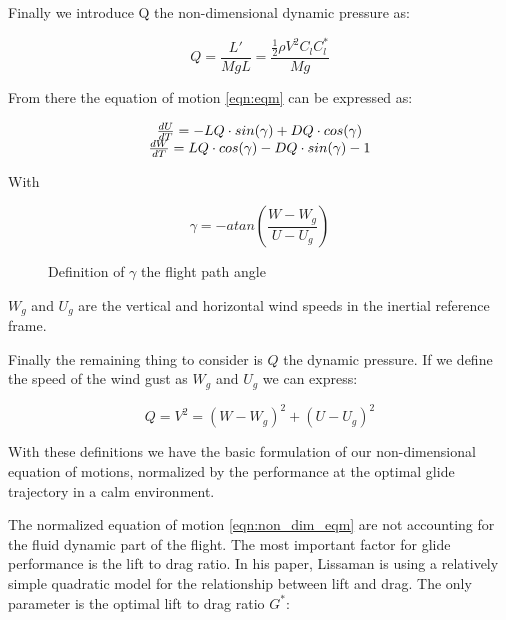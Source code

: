 \par Finally we introduce Q the non-dimensional dynamic pressure as:

\begin{equation}
Q = \frac{L'}{MgL} = \frac{\frac{1}{2} \rho V^2 C_l C_l^* }{Mg}
\label{eqn:dynamic_pressure}
\end{equation}

\par From there the equation of motion \ref{eqn:eqm} can be expressed as:

\begin{equation}
\begin{array}[c]{c}
  \frac{dU}{dT}= -LQ \cdot sin(\gamma) + DQ \cdot cos(\gamma) \\ 
  \frac{dW}{dT}= LQ \cdot cos(\gamma) - DQ \cdot sin(\gamma) - 1
\end{array}
\label{eqn:non_dim_eqm}
\end{equation}

With 

\begin{equation}
\gamma = -atan(\frac{W-W_g}{U-U_g})
\label{eqn:gamma_def}
\end{equation}

\begin{figure}[h]
  \centering
  \caption{Definition of $\gamma$ the flight path angle}
  \label{fig:gamma}
\end{figure}


$W_g$ and $U_g$ are the vertical and horizontal wind speeds in the inertial reference frame.

\par Finally the remaining thing to consider is $Q$ the dynamic pressure. If we define the speed of the wind gust as $W_g$ and $U_g$ we can express:

\begin{equation}
Q = V^2 = (W-W_g)^2 + (U-U_g)^2
\label{eqn:q_def}
\end{equation}

\par With these definitions we have the basic formulation of our non-dimensional equation of motions, normalized by the performance at the optimal glide trajectory in a calm environment.

The normalized equation of motion \ref{eqn:non_dim_eqm} are not accounting for the fluid dynamic part of the flight.
The most important factor for glide performance is the lift to drag ratio. 
In his paper, Lissaman \cite{Lissaman2007neutral} is using a relatively simple quadratic model for the relationship between lift and drag.
The only parameter is the optimal lift to drag ratio $G^*$:

